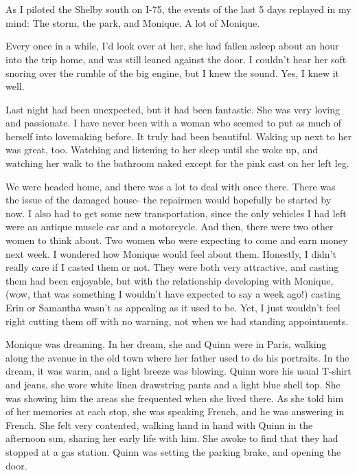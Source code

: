 \chapter{~}
As I piloted the Shelby south on I-75, the events of the last 5 days replayed in my mind:
The storm, the park, and Monique. A lot of Monique.

Every once in a while, I'd look over at her, she had fallen asleep about an hour into the
trip home, and was still leaned against the door. I couldn't hear her soft snoring over the
rumble of the big engine, but I knew the sound. Yes, I knew it well.

Last night had been unexpected, but it had been fantastic. She was very loving and
passionate. I have never been with a woman who seemed to put as much of herself into lovemaking
before. It truly had been beautiful. Waking up next to her was great, too. Watching and
listening to her sleep until she woke up, and watching her walk to the bathroom naked except for
the pink cast on her left leg.

We were headed home, and there was a lot to deal with once there. There was the issue of
the damaged house- the repairmen would hopefully be started by now. I also had to get some new
transportation, since the only vehicles I had left were an antique muscle car and a motorcycle.
And then, there were two other women to think about. Two women who were expecting to come and
earn money next week. I wondered how Monique would feel about them. Honestly, I didn't really
care if I casted them or not. They were both very attractive, and casting them had been
enjoyable, but with the relationship developing with Monique, (wow, that was something I
wouldn't have expected to say a week ago!) casting Erin or Samantha wasn't as appealing as it
used to be. Yet, I just wouldn't feel right cutting them off with no warning, not when we had
standing appointments.

\begin{thought}
Monique was dreaming. In her dream, she and Quinn were in Paris, walking along the avenue
in the old town where her father used to do his portraits. In the dream, it was warm, and a
light breeze was blowing. Quinn wore his usual T-shirt and jeans, she wore white linen
drawstring pants and a light blue shell top. She was showing him the areas she frequented when
she lived there. As she told him of her memories at each stop, she was speaking French, and he
was answering in French. She felt very contented, walking hand in hand with Quinn in the
afternoon sun, sharing her early life with him. She awoke to find that they had stopped at a gas
station. Quinn was setting the parking brake, and opening the door.
\end{thought}

